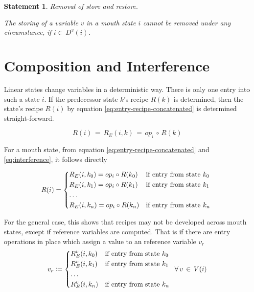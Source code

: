 \documentclass[12pt,a4paper]{scrartcl}
\newtheorem{statement}{Statement}
\begin{document}
\begin{statement} Removal of store and restore. \label{stm:release-sr}

    The storing of a variable $v$ in a mouth state $i$ cannot be
    removed under any circumstance, if $i\in\,D^v(i)$.
    
\end{statement}


%
\section{Composition and Interference}

Linear states change variables in a deterministic way. There is only one entry
into such a state $i$. If the predecessor state $k$'s recipe $R(k)$ is
determined, then the state's recipe $R(i)$ by equation \eqref{eq:entry-recipe-concatenated} 
is determined straight-forward.

\begin{equation} \label{eq:linear-state-recipe}
    R(i) \,=\,R_E(i,k) \,=\, op_i\,\circ\,R(k)
\end{equation}

For a mouth state, from equation \eqref{eq:entry-recipe-concatenated} and
\eqref{eq:interference}, it follows directly

\begin{equation} \label{eq:mouth-state-recipe}
    R(i) = 
        \begin{dcases*}
        R_E(i,k_0) = op_i\circ R(k_0) & if entry from state $k_0$ \\
        R_E(i,k_1) = op_i\circ R(k_1) & if entry from state $k_1$ \\
        \ldots                                                     \\
        R_E(i,k_n) = op_i\circ R(k_n) & if entry from state $k_n$ \\
        \end{dcases*}
\end{equation}

For the general case, this shows that recipes may not be developed across
mouth states, except if reference variables are computed. That is if there
are entry operations in place which assign a value to an reference variable $v_r$
\begin{equation}
    v_r \coloneqq   \begin{dcases*}
             R^v_E(i,k_0) & if entry from state $k_0$ \\
             R^v_E(i,k_1) & if entry from state $k_1$ \\
             \ldots \\
             R^v_E(i,k_n) & if entry from state $k_n$ \\
            \end{dcases*}
            \,\forall\,v\,\in\,V(i)
\end{equation}
\end{document}
